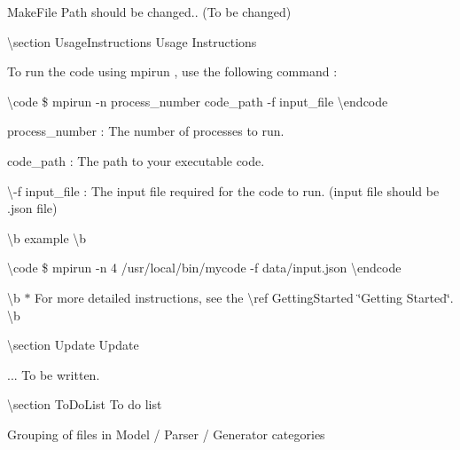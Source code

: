 \begin{DoxyItemize}
\item Make\-File Path should be changed.. (To be changed)
\end{DoxyItemize}

\textbackslash{}section Usage\-Instructions Usage Instructions

To run the code using {\ttfamily  mpirun }, use the following command \-:

\textbackslash{}code \$ mpirun -\/n process\-\_\-number code\-\_\-path -\/f input\-\_\-file \textbackslash{}endcode


\begin{DoxyItemize}
\item process\-\_\-number \-: The number of processes to run.
\item code\-\_\-path \-: The path to your executable code.
\item \textbackslash{}-\/f input\-\_\-file \-: The input file required for the code to run. (input file should be {\ttfamily .json} file)
\end{DoxyItemize}

\textbackslash{}b example \textbackslash{}b

\textbackslash{}code \$ mpirun -\/n 4 /usr/local/bin/mycode -\/f data/input.\-json \textbackslash{}endcode

\textbackslash{}b $\ast$ For more detailed instructions, see the \textbackslash{}ref Getting\-Started \char`\"{}\-Getting Started\char`\"{}. \textbackslash{}b

\textbackslash{}section Update Update

... To be written.

\textbackslash{}section To\-Do\-List To do list
\begin{DoxyItemize}
\item Grouping of files in Model / Parser / Generator categories 
\end{DoxyItemize}